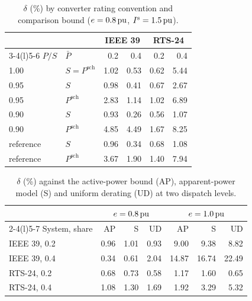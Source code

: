 \begin{table}[t]
  \caption{$\delta$ (\%) by converter rating convention and comparison bound
  ($e = \SI{0.8}{\ensuremath{\mathrm{pu}}}$, $I^{\mathrm{s}} = \SI{1.5}{\ensuremath{\mathrm{pu}}}$).}
  \label{tab:rating}
  \centering
  \small
  \begin{tabular*}{\columnwidth}{@{\extracolsep{\fill}}ll rr rr@{}}
    \toprule
    & & \multicolumn{2}{c}{IEEE 39} & \multicolumn{2}{c}{RTS-24} \\
    \cmidrule(lr){3-4}\cmidrule(l){5-6}
    $P/S$ & $\bar{P}$ & 0.2 & 0.4 & 0.2 & 0.4 \\
    \midrule
    1.00 & $S = P^{\mathrm{sch}}$ & 1.02 & 0.53 & 0.62 & 5.44 \\
    0.95 & $S$ & 0.98 & 0.41 & 0.67 & 2.67 \\
    0.95 & $P^{\mathrm{sch}}$ & 2.83 & 1.14 & 1.02 & 6.89 \\
    0.90 & $S$ & 0.93 & 0.26 & 0.56 & 1.07 \\
    0.90 & $P^{\mathrm{sch}}$ & 4.85 & 4.49 & 1.67 & 8.25 \\
    reference & $S$ & 0.96 & 0.34 & 0.68 & 1.08 \\
    reference & $P^{\mathrm{sch}}$ & 3.67 & 1.90 & 1.40 & 7.94 \\
    \bottomrule
  \end{tabular*}
\end{table}

\begin{table}[t]
	\caption{$\delta$ (\%) against the active-power bound (AP), apparent-power
		model (S) and uniform derating (UD) at two dispatch levels.}
	\label{tab:ladder}
	\centering
	\small
	\begin{tabular*}{\columnwidth}{@{\extracolsep{\fill}}l rrr rrr@{}}
		\toprule
		& \multicolumn{3}{c}{$e = \SI{0.8}{\ensuremath{\mathrm{pu}}}$}
		& \multicolumn{3}{c}{$e = \SI{1.0}{\ensuremath{\mathrm{pu}}}$} \\
		\cmidrule(lr){2-4}\cmidrule(l){5-7}
		System, share & AP & S & UD & AP & S & UD \\
		\midrule
		IEEE 39, 0.2 & 0.96 & 1.01 & 0.93 & 9.00 & 9.38 & 8.82 \\
		IEEE 39, 0.4 & 0.34 & 0.61 & 2.04 & 14.87 & 16.74 & 22.49 \\
		RTS-24, 0.2  & 0.68 & 0.73 & 0.58 & 1.17 & 1.60 & 0.65 \\
		RTS-24, 0.4  & 1.08 & 1.30 & 1.69 & 1.92 & 3.29 & 5.32 \\
		\bottomrule
	\end{tabular*}
\end{table}


